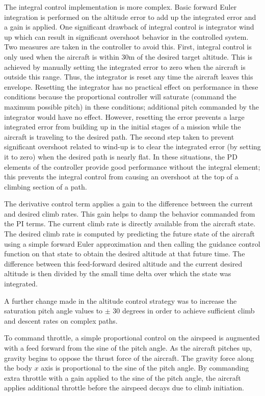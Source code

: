\documentclass{aiaa}
\begin{document}
The integral control implementation is more complex. Basic forward Euler integration is performed on the altitude error to add up the integrated error and a gain is applied. One significant drawback of integral control is integrator wind up which can result in significant overshoot behavior in the controlled system. Two measures are taken in the controller to avoid this. First, integral control is only used when the aircraft is within 30m of the desired target altitude. This is achieved by manually setting the integrated error to zero when the aircraft is outside this range. Thus, the integrator is reset any time the aircraft leaves this envelope. Resetting the integrator has no practical effect on performance in these conditions because the proportional controller will saturate (command the maximum possible pitch) in these conditions; additional pitch commanded by the integrator would have no effect. However, resetting the error prevents a large integrated error from building up in the initial stages of a mission while the aircraft is traveling to the desired path. The second step taken to prevent significant overshoot related to wind-up is to clear the integrated error (by setting it to zero) when the desired path is nearly flat. In these situations, the PD elements of the controller provide good performance without the integral element; this prevents the integral control from causing an overshoot at the top of a climbing section of a path.

The derivative control term applies a gain to the difference between the current and desired climb rates.  This gain helps to damp the behavior commanded from the PI terms. The current climb rate is directly available from the aircraft state. The desired climb rate is computed by predicting the future state of the aircraft using a simple forward Euler approximation and then calling the guidance control function on that state to obtain the desired altitude at that future time. The difference between this feed-forward desired altitude and the current desired altitude is then divided by the small time delta over which the state was integrated.

A further change made in the altitude control strategy was to increase the saturation pitch angle values to $\pm$ 30 degrees in order to achieve sufficient climb and descent rates on complex paths.

To command throttle, a simple proportional control on the airspeed is augmented with a feed forward from the sine of the pitch angle. As the aircraft pitches up, gravity begins to oppose the thrust force of the aircraft. The gravity force along the body $x$ axis is proportional to the sine of the pitch angle. By commanding extra throttle with a gain applied to the sine of the pitch angle, the aircraft applies additional throttle before the airspeed decays due to climb initiation.
\end{document}
